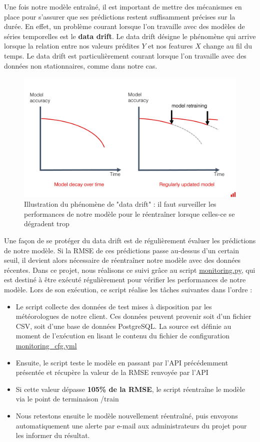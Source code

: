 \documentclass[french]{article}
\begin{document}
    Une fois notre modèle entraîné, il est important de mettre des mécanismes en place pour s'assurer que ses prédictions restent suffisamment précises sur la durée. En effet, un problème courant lorsque l'on travaille avec des modèles de séries temporelles est le \textbf{data drift}. Le data drift désigne le phénomène qui arrive lorsque la relation entre nos valeurs prédites $Y$ et nos features $X$ change au fil du temps. Le data drift est particulièrement courant lorsque l'on travaille avec des données non stationnaires, comme dans notre cas.
    \begin{figure}[h]
        \includegraphics[width=12cm]{data_drift}
        \centering
        \caption{Illustration du phénomène de "data drift" : il faut surveiller les performances de notre modèle pour le réentraîner lorsque celles-ce se dégradent trop}
        \centering
    \end{figure}
    Une façon de se protéger du data drift est de régulièrement évaluer les prédictions de notre modèle. Si la RMSE de ces prédictions passe au-dessus d'un certain seuil, il devient alors nécessaire de réentraîner notre modèle avec des données récentes. Dans ce projet, nous réalisons ce suivi grâce au script \href{https://github.com/vinpap/predict_climate_change/blob/main/monitoring.py}{monitoring.py}, qui est destiné à être exécuté régulièrement pour vérifier les performances de notre modèle. Lors de son exécution, ce script réalise les tâches suivantes dans l'ordre :
    \begin{itemize}
        \item Le script collecte des données de test mises à disposition par les météorologues de notre client. Ces données peuvent provenir soit d'un fichier CSV, soit d'une base de données PostgreSQL. La source est définie au moment de l'exécution en lisant le contenu du fichier de configuration \href{https://github.com/vinpap/predict_climate_change/blob/main/monitoring_cfg.yml}{monitoring\_cfg.yml}
        \item Ensuite, le script teste le modèle en passant par l'API précédemment présentée et récupère la valeur de la RMSE renvoyée par l'API
        \item Si cette valeur dépasse \textbf{105\% de la RMSE}, le script réentraîne le modèle via le point de terminaison /train
        \item Nous retestons ensuite le modèle nouvellement réentraîné, puis envoyons automatiquement une alerte par e-mail aux administrateurs du projet pour les informer du résultat.
    \end{itemize}
\end{document}
